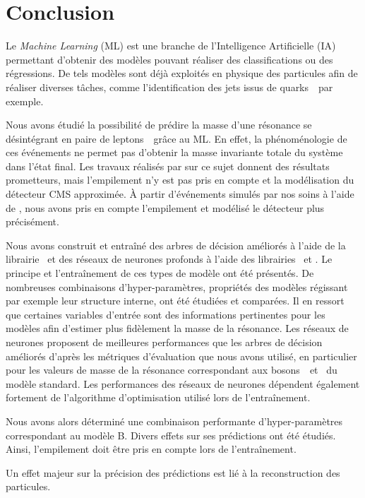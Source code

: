 \section{Conclusion}\label{chapter-ML-section-conclusion}
Le \emph{Machine Learning} (ML) est une branche de l'Intelligence Artificielle (IA)
permettant d'obtenir des modèles pouvant réaliser des classifications ou des régressions.
De tels modèles sont déjà exploités en physique des particules afin de réaliser diverses tâches,
comme l'identification des jets issus de quarks~\quarkb\ par exemple.
\par
Nous avons étudié la possibilité de prédire la masse d'une résonance se désintégrant en paire de leptons~\tau\ grâce au ML.
En effet, la phénoménologie de ces événements ne permet pas d'obtenir la masse invariante totale du système dans l'état final.
Les travaux réalisés par \citeauthor{BARTSCHI201929} sur ce sujet donnent des résultats prometteurs,
mais l'empilement n'y est pas pris en compte et la modélisation du détecteur CMS approximée.
À partir d'événements simulés par nos soins à l'aide de \FASTSIM,
nous avons pris en compte l'empilement et modélisé le détecteur plus précisément.
\par
Nous avons construit et entraîné
des arbres de décision améliorés
à l'aide de la librairie \XGBOOST\
et
des réseaux de neurones profonds
à l'aide des librairies \KERAS\ et \TENSORFLOW.
Le principe et l'entraînement de ces types de modèle ont été présentés.
De nombreuses combinaisons d'hyper-paramètres,
propriétés des modèles régissant par exemple leur structure interne,
ont été étudiées et comparées.
Il en ressort que certaines variables d'entrée sont des informations pertinentes pour les modèles
afin d'estimer plus fidèlement la masse de la résonance.
Les réseaux de neurones
proposent de meilleures performances que
les arbres de décision améliorés
d'après les métriques d'évaluation que nous avons utilisé,
en particulier pour les valeurs de masse de la résonance correspondant aux bosons~\Zboson\ et \higgs\ du modèle standard.
Les performances des réseaux de neurones dépendent également fortement de l'algorithme d'optimisation utilisé lors de l'entraînement.
\par
Nous avons alors déterminé une combinaison performante d'hyper-paramètres correspondant au modèle B.
Divers effets sur ses prédictions ont été étudiés.
Ainsi, l'empilement doit être pris en compte lors de l'entraînement.
\par
Un effet majeur sur la précision des prédictions est lié à la reconstruction des particules.
